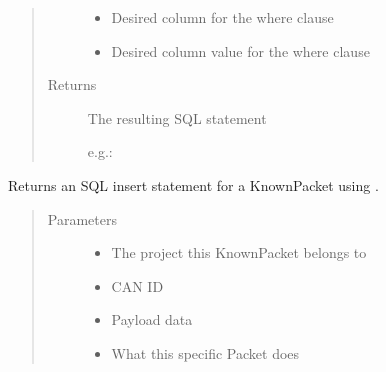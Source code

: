 \documentclass[letterpaper,10pt,english]{sphinxmanual}
\begin{document}
\begin{fulllineitems}
\begin{fulllineitems}
\begin{quote}
\begin{description}
\begin{itemize}
\item {} 
 \textendash{} Desired column for the where clause

\item {} 
 \textendash{} Desired column value for the where clause

\end{itemize}

\item[{Returns}] \leavevmode

The resulting SQL statement

e.g.: 


\end{description}\end{quote}

\end{fulllineitems}


\begin{fulllineitems}
\label{\detokenize{src:src.Database.DatabaseStatements.getInsertKnownPacketStatement}}
Returns an SQL insert statement for a KnownPacket using {\hyperref[\detokenize{src:src.Database.DatabaseStatements.getInsertStatement}]{}}.
\begin{quote}\begin{description}
\item[{Parameters}] \leavevmode\begin{itemize}
\item {} 
 \textendash{} The project this KnownPacket belongs to

\item {} 
 \textendash{} CAN ID

\item {} 
 \textendash{} Payload data

\item {} 
 \textendash{} What this specific Packet does

\end{itemize}


\end{description}
\end{quote}
\end{fulllineitems}
\end{fulllineitems}
\end{document}

